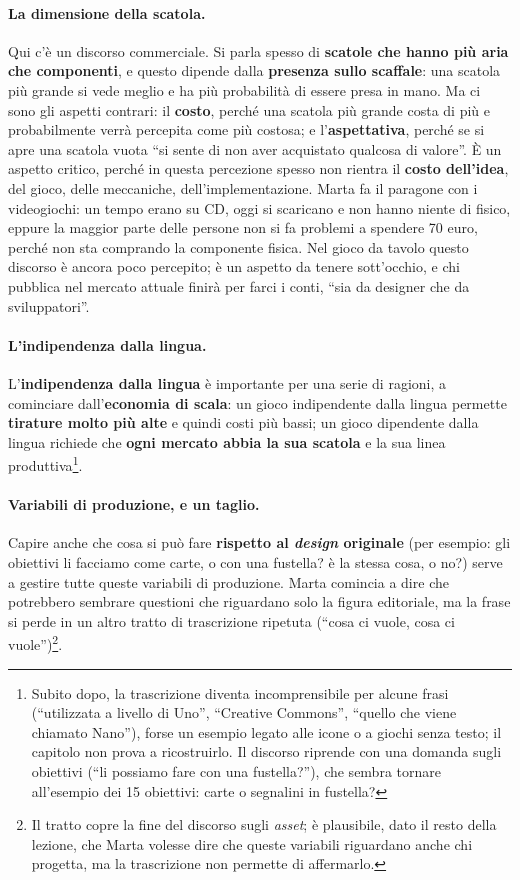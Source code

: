 \paragraph{La dimensione della scatola.} Qui c'è un discorso commerciale. Si parla spesso di
\textbf{scatole che hanno più aria che componenti}, e questo dipende dalla \textbf{presenza
sullo scaffale}: una scatola più grande si vede meglio e ha più probabilità di essere presa
in mano. Ma ci sono gli aspetti contrari: il \textbf{costo}, perché una scatola più grande
costa di più e probabilmente verrà percepita come più costosa; e l'\textbf{aspettativa}, perché
se si apre una scatola vuota ``si sente di non aver acquistato qualcosa di valore''. È un
aspetto critico, perché in questa percezione spesso non rientra il \textbf{costo dell'idea}, del
gioco, delle meccaniche, dell'implementazione. Marta fa il paragone con i videogiochi: un tempo
erano su CD, oggi si scaricano e non hanno niente di fisico, eppure la maggior parte delle
persone non si fa problemi a spendere 70 euro, perché non sta comprando la componente fisica.
Nel gioco da tavolo questo discorso è ancora poco percepito; è un aspetto da tenere
sott'occhio, e chi pubblica nel mercato attuale finirà per farci i conti, ``sia da designer
che da sviluppatori''.

\paragraph{L'indipendenza dalla lingua.} L'\textbf{indipendenza dalla lingua} è importante per
una serie di ragioni, a cominciare dall'\textbf{economia di scala}: un gioco indipendente dalla
lingua permette \textbf{tirature molto più alte} e quindi costi più bassi; un gioco dipendente
dalla lingua richiede che \textbf{ogni mercato abbia la sua scatola} e la sua linea
produttiva\footnote{Subito dopo, la trascrizione diventa incomprensibile per alcune frasi
(``utilizzata a livello di Uno'', ``Creative Commons'', ``quello che viene chiamato Nano''),
forse un esempio legato alle icone o a giochi senza testo; il capitolo non prova a
ricostruirlo. Il discorso riprende con una domanda sugli obiettivi (``li possiamo fare con
una fustella?''), che sembra tornare all'esempio dei 15 obiettivi: carte o segnalini in
fustella?}.

\paragraph{Variabili di produzione, e un taglio.} Capire anche che cosa si può fare
\textbf{rispetto al \emph{design} originale} (per esempio: gli obiettivi li facciamo come carte,
o con una fustella? è la stessa cosa, o no?) serve a gestire tutte queste variabili di
produzione. Marta comincia a dire che potrebbero sembrare questioni che riguardano solo la
figura editoriale, ma la frase si perde in un altro tratto di trascrizione ripetuta (``cosa ci
vuole, cosa ci vuole'')\footnote{Il tratto copre la fine del discorso sugli \emph{asset}; è
plausibile, dato il resto della lezione, che Marta volesse dire che queste variabili
riguardano anche chi progetta, ma la trascrizione non permette di affermarlo.}.

